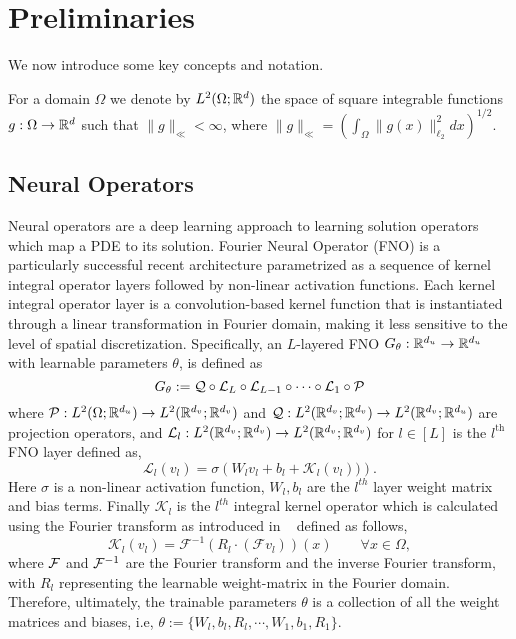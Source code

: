 \section{Preliminaries}
\label{sec:background}
We now introduce some key concepts and notation. 
\begin{definition}[$L^2(\Omega; \R^d)$]
    For a domain $\Omega$ we denote by $L^2(\Omega; \R^d)$ 
    the space of square integrable functions $g: \Omega \to \mathbb{R}^d$
    such that 
    $\|g\|_{\ll} < \infty$, where
    $\|g\|_{\ll} = \left(\int_\Omega \|g(x)\|_{\ell_2}^2 dx\right)^{1/2}$.
\end{definition}

\subsection{Neural Operators}
Neural operators \citep{lu2019deeponet, li2020fourier, bhattacharya2021model, patel2021physics, kovachki2023neural} 
are a deep learning approach to learning solution operators which map a PDE to its solution. 
Fourier Neural Operator (FNO) \citep{li2020fourier} is a particularly successful recent architecture 
parametrized as a sequence of kernel integral operator layers followed by non-linear activation functions. Each kernel integral operator layer is a convolution-based kernel function that is instantiated through a linear transformation in Fourier domain, making it less sensitive to the level of spatial discretization. Specifically, an $L$-layered FNO 
$G_\theta: \mathbb{R}^{d_u} \to \mathbb{R}^{d_u}$ 
with learnable parameters $\theta$, is defined as 
\begin{equation}
    \label{eq:fno_layer_def}
    G_\theta := {\mathcal{Q}} \circ \mathcal{L}_L \circ \mathcal{L}_{L-1} \circ \cdots \circ \mathcal{L}_1 \circ {\mathcal{P}}
\end{equation}
where 
$\mathcal{P}: L^2(\Omega;\mathbb{R}^{d_u}) \to L^2(\mathbb{R}^{d_v};\mathbb{R}^{d_v})$ 
and 
$\mathcal{Q}: L^2(\mathbb{R}^{d_v};\mathbb{R}^{d_v}) \to  
L^{2}(\mathbb{R}^{d_v};\mathbb{R}^{d_u}) $ 
are projection operators, 
and 
$\mathcal{L}_{l}: L^2(\mathbb{R}^{d_v};\mathbb{R}^{d_v})\to L^2(\mathbb{R}^{d_v};\mathbb{R}^{d_v})$
for $l \in [L]$ is the $l^{\text{th}}$ FNO layer defined as, 
\begin{equation}
    \label{eq:fno_layer}
    \mathcal{L}_{l}\left(v_{l}\right) 
    = \sigma \left(W_{l} v_{l} + b_{l} + \mathcal{K}_{l}(v_l))\right).
\end{equation}
Here $\sigma$ is a non-linear activation function, $W_l, b_l$ are the $l^{th}$ layer weight matrix and bias terms. Finally
$\mathcal{K}_{l}$ 
is the $l^{th}$ integral kernel operator 
which is calculated using the Fourier transform as introduced in ~\citet{li2020fourier}
defined as follows,
\begin{equation}
    \label{eq:kernal_integral_operator}
    \mathcal{K}_l(v_l) = \mathcal{F}^{-1} \left(R_l \cdot \left(\mathcal{F} v_l\right)\right)(x) \qquad \forall x \in \Omega, 
\end{equation}
where $\mathcal{F}$ and $\mathcal{F}^{-1}$ are the 
Fourier transform and the inverse 
Fourier transform, with $R_l$
representing the learnable weight-matrix in the Fourier domain. 
Therefore, ultimately, the trainable parameters $\theta$ is a collection of all the weight matrices and biases, i.e, 
$\theta := \{W_l, b_l, R_l, \cdots, W_1, b_1, R_1\}$.



